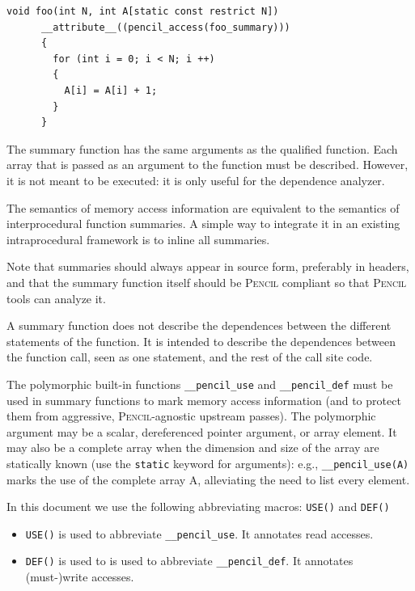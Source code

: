 \documentclass{carp}
\newcommand\pencil{\textsc{Pencil}\xspace}
\begin{document}
\begin{description}
\begin{lstlisting}[language=pencil]
    void foo(int N, int A[static const restrict N])
      __attribute__((pencil_access(foo_summary)))
      {
        for (int i = 0; i < N; i ++)
        {
          A[i] = A[i] + 1;
        }
      }
  \end{lstlisting}
  
  The summary function has the same arguments as the
  qualified function.  Each array that is passed as an argument to the
  function must be described.
  However, it is not meant to be executed: it is only
  useful for the dependence analyzer.
  
  The semantics of
  memory access information are equivalent to the semantics
  of interprocedural function summaries.  A simple way to integrate
  it in an existing intraprocedural framework is to inline all
  summaries.

  Note that summaries should always appear in source form,
  preferably in headers, and that the summary function itself
  should be \pencil compliant so that \pencil tools can
  analyze it.
  
  A summary function does not describe the dependences between the
  different statements of the function.  It is intended to describe
  the dependences between the function call, seen as one statement,
  and the rest of the call site code.

  The polymorphic built-in functions \lstinline!__pencil_use!
  and \lstinline!__pencil_def! must be used in summary
  functions to mark memory access information (and to protect them
  from aggressive, \pencil-agnostic upstream passes). The
  polymorphic argument may be a scalar,
  dereferenced pointer argument, or array element. It may also be a
  complete array when the dimension and size of the array are
  statically known (use the \lstinline!static! keyword for
  arguments): e.g., \lstinline!__pencil_use(A)! marks the use of the
  complete array A, alleviating the need to list every
  element.

  In this document we use the following abbreviating macros:
  \lstinline!USE()! and \lstinline!DEF()!
  \begin{itemize}
   \item \lstinline!USE()! is used to abbreviate \lstinline!__pencil_use!.
         It annotates read accesses.
   \item \lstinline!DEF()! is used to is used to abbreviate \lstinline!__pencil_def!.
         It annotates (must-)write accesses.
  \end{itemize}


\end{description}
\end{document}
